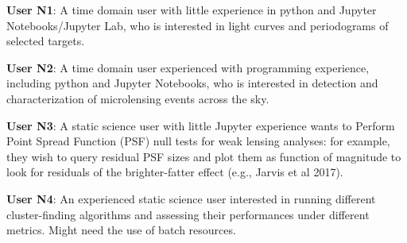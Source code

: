 {\bf User N1}: A time domain user with little experience in python and Jupyter Notebooks/Jupyter Lab, who is interested in light curves and periodograms of selected targets. 

{\bf User N2}:   A time domain user experienced with programming experience, including python and Jupyter Notebooks, who is interested in detection and characterization of microlensing events across the sky.

{\bf User N3}:   A static science user with little Jupyter experience wants to Perform Point Spread Function (PSF) null tests for weak lensing analyses: for example, they wish to query residual PSF sizes and plot them as function of magnitude to look for residuals of the brighter-fatter effect (e.g., Jarvis et al 2017).

{\bf User N4}:  An experienced static science user interested in running different cluster-finding algorithms and assessing their performances under different metrics. Might need the use of batch resources. 
